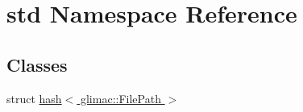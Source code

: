 \hypertarget{namespacestd}{}\section{std Namespace Reference}
\label{namespacestd}
\subsection*{Classes}
\begin{DoxyCompactItemize}
\item 
struct \hyperlink{structstd_1_1hash_3_01glimac_1_1_file_path_01_4}{hash$<$ glimac\+::\+File\+Path $>$}
\end{DoxyCompactItemize}
